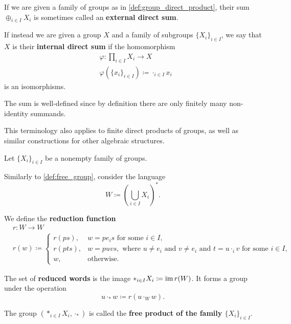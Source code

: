 \begin{note}\label{def:group_direct_sum_external_internal}\cite[126]{Knapp2016BAlg}
  If we are given a family of groups as in \cref{def:group_direct_product}, their sum \( \oplus_{i \in I} X_i \) is sometimes called an \textbf{external direct sum}.

  If instead we are given a group \( X \) and a family of subgroups \( \{ X_i \}_{i \in I} \), we say that \( X \) is their \textbf{internal direct sum} if the homomorphism
  \begin{align*}
    &\varphi: \prod_{i \in I} X_i \to X \\
    &\varphi(\{ x_i \}_{i \in I}) \coloneqq \cdot_{i \in I} x_i
  \end{align*}
  is an isomorphisms.

  The sum is well-defined since by definition there are only finitely many non-identity summands.

  This terminology also applies to finite direct products of groups, as well as similar constructions for other algebraic structures.
\end{note}

\begin{definition}\label{def:group_free_product}\cite[323]{Knapp2016BAlg}
  Let \( \{ X_i \}_{i \in I} \) be a nonempty family of groups.

  Similarly to \cref{def:free_group}, consider the language
  \begin{equation*}
    W \coloneqq \left( \bigcup_{i \in I} X_i \right)^{*}.
  \end{equation*}

  We define the \textbf{reduction function}
  \begin{align*}
    &r: W \to W \\
    &r(w) \coloneqq \begin{cases}
      r(ps), &w = p e_i s \text{ for some } i \in I, \\
      r(pts), &w = puvs, \text{ where } u \neq e_i \text{ and } v \neq e_i \text{ and } t = u \cdot_i v \text{ for some } i \in I, \\
      w, &\text{otherwise}.
    \end{cases}
  \end{align*}

  The set of \textbf{reduced words} is the image \( \ast_{i \in I} X_i \coloneqq \operatorname{im} r(W) \). It forms a group under the operation
  \begin{equation*}
    u \cdot_\ast w \coloneqq r(u \cdot_{W} w).
  \end{equation*}

  The group \( (\ast_{i \in I} X_i, \cdot_\ast) \) is called the \textbf{free product of the family \( \{ X_i \}_{i \in I} \)}.
\end{definition}

